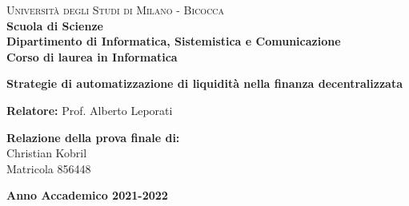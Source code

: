 \documentclass{report}
\begin{document}
\begin{titlepage}
        
        \noindent
        \begin{minipage}[t]{0.19\textwidth}
        \end{minipage}
        \begin{minipage}[t]{0.81\textwidth}
        {
                {\textsc{Università degli Studi di Milano - Bicocca}} \\
                \textbf{Scuola di Scienze} \\
                \textbf{Dipartimento di Informatica, Sistemistica e Comunicazione} \\
                \textbf{Corso di laurea in Informatica} \\
                \par
        }
        \end{minipage}
        
	\vspace{40mm}
        
	\begin{center}
            {\LARGE{
                    \textbf{Strategie di automatizzazione di liquidità nella finanza decentralizzata}
                    \par
            }}
        \end{center}
        
        \vspace{50mm}

        \noindent
        {\large \textbf{Relatore:} Prof. Alberto Leporati } \\
        
        \vspace{15mm}

        \begin{flushright}
            {\large \textbf{Relazione della prova finale di:}} \\
            \large{Christian Kobril} \\
            \large{Matricola 856448} 
        \end{flushright}
        
        \vspace{40mm}
        \begin{center}
            {\large{\bf Anno Accademico 2021-2022}}
        \end{center}

        \restoregeometry
        
    \end{titlepage}
\end{document}
